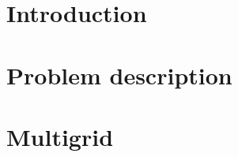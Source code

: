 \documentclass[12pt,MSc,twoside]{muthesis}
\begin{document}
\iffalse 
	 
\fi


\chapter{Introduction}


\chapter{Problem description}


\chapter{Multigrid}




\end{document}
